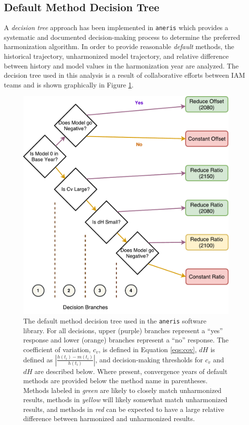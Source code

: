 \documentclass[review]{elsarticle}
\newcommand{\code}[1]{\lstinline[basicstyle=\ttfamily\color{black}]|#1|}
\newcommand{\codeb}[1]{\texttt{#1}}
\begin{document}
\subsection{Default Method Decision Tree}\label{sec:tree}

A \textit{decision tree} approach has been implemented in \codeb{aneris} which
provides a systematic and documented decision-making process to determine the
preferred harmonization algorithm. In order to provide reasonable
\textit{default} methods, the historical trajectory, unharmonized model
trajectory, and relative difference between history and model values in the
harmonization year are analyzed. The decision tree used in this analysis is a
result of collaborative efforts between IAM teams and is shown graphically in
Figure \ref{fig:decision_tree}.


\begin{figure}
  \begin{center}
    \includegraphics[width=\textwidth]{decision_tree.pdf}
    \caption[]{
      \label{fig:decision_tree}
      The default method decision tree used in the \code{aneris} software
      library. For all decisions, upper (purple) branches represent a ``yes''
      response and lower (orange) branches represent a ``no'' response. The
      coefficient of variation, $c_v$, is defined in Equation \ref{eqs:cov},
      $dH$ is defined as $\left|\frac{h(t_i) - m(t_i)}{h(t_i)}\right|$, and
      decision-making thresholds for $c_v$ and $dH$ are described below.  Where
      present, convergence years of default methods are provided below the
      method name in parentheses.  Methods labeled in \textit{green} are likely
      to closely match unharmonized results, methods in \textit{yellow} will
      likely somewhat match unharmonized results, and methods in \textit{red}
      can be expected to have a large relative difference between harmonized and
      unharmonized results.}
  \end{center}
\end{figure}
\end{document}
